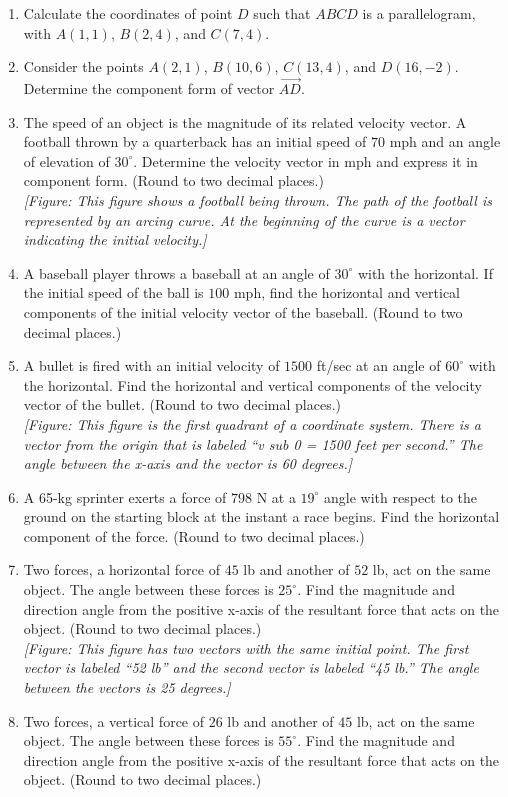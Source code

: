 \documentclass{exercises}
\begin{document}
\begin{enumerate}[resume]
\item Calculate the coordinates of point $D$ such that $ABCD$ is a parallelogram, with $A(1,1)$, $B(2,4)$, and $C(7,4)$.
\item Consider the points $A(2,1)$, $B(10,6)$, $C(13,4)$, and $D(16,-2)$. Determine the component form of vector $\overset{\to}{AD}$.
\item The speed of an object is the magnitude of its related velocity vector. A football thrown by a quarterback has an initial speed of $70$ mph and an angle of elevation of $30^\circ$. Determine the velocity vector in mph and express it in component form. (Round to two decimal places.) \\ \textit{[Figure: This figure shows a football being thrown. The path of the football is represented by an arcing curve. At the beginning of the curve is a vector indicating the initial velocity.]}
\item A baseball player throws a baseball at an angle of $30^\circ$ with the horizontal. If the initial speed of the ball is $100$ mph, find the horizontal and vertical components of the initial velocity vector of the baseball. (Round to two decimal places.)
\item A bullet is fired with an initial velocity of $1500$ ft/sec at an angle of $60^\circ$ with the horizontal. Find the horizontal and vertical components of the velocity vector of the bullet. (Round to two decimal places.) \\ \textit{[Figure: This figure is the first quadrant of a coordinate system. There is a vector from the origin that is labeled ``v sub 0 = 1500 feet per second.'' The angle between the x-axis and the vector is 60 degrees.]}
\item \techrequired A 65-kg sprinter exerts a force of $798$ N at a $19^\circ$ angle with respect to the ground on the starting block at the instant a race begins. Find the horizontal component of the force. (Round to two decimal places.)
\item \techrequired Two forces, a horizontal force of $45$ lb and another of $52$ lb, act on the same object. The angle between these forces is $25^\circ$. Find the magnitude and direction angle from the positive x-axis of the resultant force that acts on the object. (Round to two decimal places.) \\ \textit{[Figure: This figure has two vectors with the same initial point. The first vector is labeled ``52 lb'' and the second vector is labeled ``45 lb.'' The angle between the vectors is 25 degrees.]}
\item \techrequired Two forces, a vertical force of $26$ lb and another of $45$ lb, act on the same object. The angle between these forces is $55^\circ$. Find the magnitude and direction angle from the positive x-axis of the resultant force that acts on the object. (Round to two decimal places.)

\end{enumerate}
\end{document}

